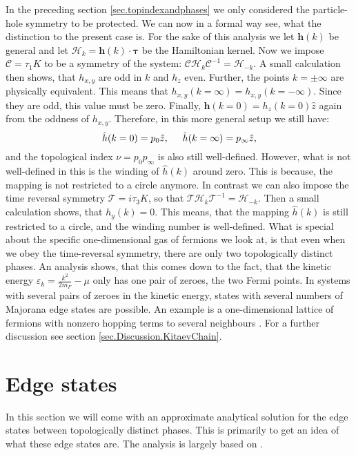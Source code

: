 In the preceding section \ref{sec.topindexandphases} we only considered the particle-hole symmetry to be protected. We can now in a formal way see, what the distinction to the present case is. For the sake of this analysis we let $\mathbf{h}(k)$ be general and let $\mathcal{H}_k = \mathbf{h}(k)\cdot \boldsymbol\tau$ be the Hamiltonian kernel. Now we impose $\mathcal{C} = \tau_1 K$ to be a symmetry of the system: $\mathcal{C}\mathcal{H}_k\mathcal{C}^{-1} = \mathcal{H}_{-k}$. A small calculation then shows, that $h_{x,y}$ are odd in $k$ and $h_z$ even. Further, the points $k= \pm \infty$ are physically equivalent. This means that $h_{x,y}(k = \infty) = h_{x,y}(k = -\infty)$. Since they are odd, this value must be zero. Finally, $\mathbf{h}(k = 0) = h_z(k = 0)\hat{z}$ again from the oddness of $h_{x,y}$. Therefore, in this more general setup we still have:
\begin{equation}
\hat{h}(k = 0) = p_0\hat{z}, \hspace{0.5cm} \hat{h}(k = \infty) = p_{\infty}\hat{z}, \nonumber
\end{equation}
and the topological index $\nu = p_0p_{\infty}$ is also still well-defined. However, what is not well-defined in this is the winding of $\hat{h}(k)$ around zero. This is because, the mapping is not restricted to a circle anymore. In contrast we can also impose the time reversal symmetry $\mathcal{T} = i\tau_3 K$, so that $\mathcal{T}\mathcal{H}_k\mathcal{T}^{-1} = \mathcal{H}_{-k}$. Then a small calculation shows, that $h_y(k) = 0$. This means, that the mapping $\hat{h}(k)$ is still restricted to a circle, and the winding number is well-defined. What is special about the specific one-dimensional gas of fermions we look at, is that even when we obey the time-reversal symmetry, there are only two topologically distinct phases. An analysis shows, that this comes down to the fact, that the kinetic energy $\varepsilon_k = \frac{k^2}{2m_F} - \mu$ only has one pair of zeroes, the two Fermi points. In systems with several pairs of zeroes in the kinetic energy, states with several numbers of Majorana edge states are possible. An example is a one-dimensional lattice of fermions with nonzero hopping terms to several neighbours \cite{Alecce.extendKitaev}. For a further discussion see section \ref{sec.Discussion.KitaevChain}. 
  

\section{Edge states}
\label{sec.edgestates}
In this section we will come with an approximate analytical solution for the edge states between topologically distinct phases. This is primarily to get an idea of what these edge states are. The analysis is largely based on \cite[pp. 196-198]{BernevigTITSC}. 

